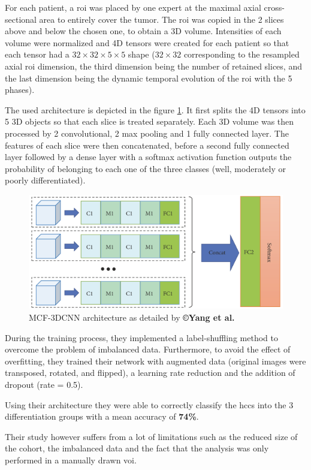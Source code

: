 For each patient, a \ac{roi} was placed by one expert at the maximal axial
cross-sectional area to entirely cover the tumor. The \ac{roi} was
copied in the 2 slices above and below the chosen one, to obtain a 3D
volume. Intensities of each volume were normalized and 4D tensors were
created for each patient so that each tensor had a $ 32\times32\times5\times5 $ shape
($ 32\times32 $ corresponding to the resampled axial \ac{roi} dimension, the third
dimension being the number of retained slices, and the last dimension being the
dynamic temporal evolution of the \ac{roi} with the 5 phases).

The used architecture is depicted in the figure \ref{fig:Yang2019_Figure2_MCF-3DCNN}. It first splits the 4D
tensors into 5 3D objects so that each slice is treated separately. Each
3D volume was then processed by 2 convolutional, 2 max pooling and 1
fully connected layer. The features of each slice were then
concatenated, before a second fully connected layer followed by a dense
layer with a softmax activation function outputs the probability of
belonging to each one of the three classes (well, moderately or poorly differentiated).

\begin{figure}[th!]
\centering
\includegraphics[width=0.7\linewidth]{images/Yang2019_Fig2}
\caption{MCF-3DCNN architecture as detailed by \textbf{©Yang et al. \cite{Yang2019}}}
\label{fig:Yang2019_Figure2_MCF-3DCNN}
\end{figure}


During the training process, they implemented a label-shuffling method
to overcome the problem of imbalanced data. Furthermore, to avoid the
effect of overfitting, they trained their network with augmented data
(original images were transposed, rotated, and flipped), a learning rate
reduction and the addition of dropout (rate = 0.5).

Using their architecture they were able to correctly classify the \ac{hcc}s
into the 3 differentiation groups with a mean accuracy of \textbf{74\%}.


Their study however suffers from a lot of limitations such as the
reduced size of the cohort, the imbalanced data and the fact that the
analysis was only performed in a manually drawn \ac{voi}.

